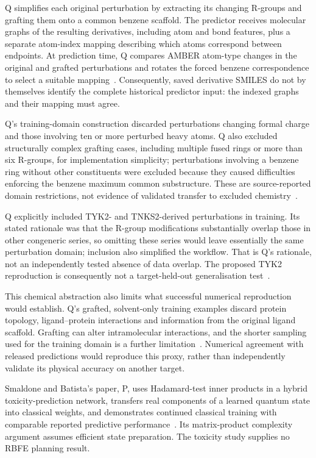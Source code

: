 \documentclass{article}
\begin{document}
Q simplifies each original perturbation by extracting its changing R-groups and grafting them onto a common benzene scaffold. The predictor receives molecular graphs of the resulting derivatives, including atom and bond features, plus a separate atom-index mapping describing which atoms correspond between endpoints. At prediction time, Q compares AMBER atom-type changes in the original and grafted perturbations and rotates the forced benzene correspondence to select a suitable mapping~\cite{Q}. Consequently, saved derivative SMILES do not by themselves identify the complete historical predictor input: the indexed graphs and their mapping must agree.

Q's training-domain construction discarded perturbations changing formal charge and those involving ten or more perturbed heavy atoms. Q also excluded structurally complex grafting cases, including multiple fused rings or more than six R-groups, for implementation simplicity; perturbations involving a benzene ring without other constituents were excluded because they caused difficulties enforcing the benzene maximum common substructure. These are source-reported domain restrictions, not evidence of validated transfer to excluded chemistry~\cite{Q}.

Q explicitly included TYK2- and TNKS2-derived perturbations in training. Its stated rationale was that the R-group modifications substantially overlap those in other congeneric series, so omitting these series would leave essentially the same perturbation domain; inclusion also simplified the workflow. That is Q's rationale, not an independently tested absence of data overlap. The proposed TYK2 reproduction is consequently not a target-held-out generalisation test~\cite{Q}.

This chemical abstraction also limits what successful numerical reproduction would establish. Q's grafted, solvent-only training examples discard protein topology, ligand--protein interactions and information from the original ligand scaffold. Grafting can alter intramolecular interactions, and the shorter sampling used for the training domain is a further limitation~\cite{Q}. Numerical agreement with released predictions would reproduce this proxy, rather than independently validate its physical accuracy on another target.

Smaldone and Batista's paper, P, uses Hadamard-test inner products in a hybrid toxicity-prediction network, transfers real components of a learned quantum state into classical weights, and demonstrates continued classical training with comparable reported predictive performance~\cite{P}. Its matrix-product complexity argument assumes efficient state preparation. The toxicity study supplies no RBFE planning result.
\end{document}
